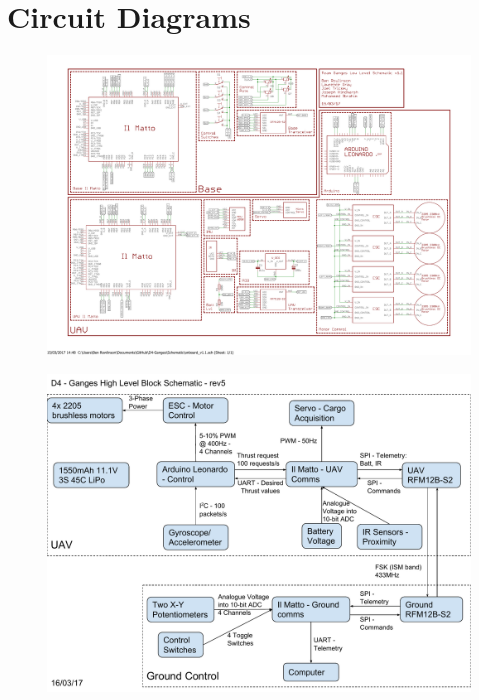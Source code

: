\documentclass[a4paper,11pt]{article}
\begin{document}
\newpage
\section{Circuit Diagrams}
\begin{figure}[!htp]
\centering
\includegraphics[height=0.9\textwidth,angle=90]{schematic.pdf}
\end{figure}
\FloatBarrier
\begin{figure}[!htp]
\centering
\includegraphics[height=0.9\textwidth,angle=90]{BlockDiagram.pdf}
\end{figure}
\FloatBarrier
\newpage
\end{document}
